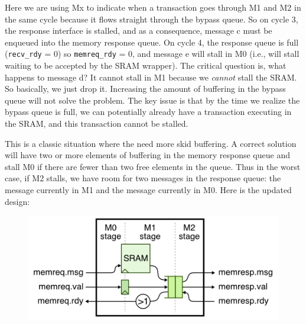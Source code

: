 \documentclass[a4paper,12pt,twoside]{article}
\begin{document}
Here we are using Mx to indicate when a transaction goes through M1 and M2 in the same cycle because it flows straight through the bypass queue. So on cycle 3, the response interface is stalled, and as a consequence, message c must be enqueued into the memory response queue. On cycle 4, the response queue is full (\texttt{recv\_rdy} = 0) so \texttt{memreq\_rdy} = 0, and message e will stall in M0 (i.e., will stall waiting to be accepted by the SRAM wrapper). The critical question is, what happens to message d? It cannot stall in M1 because we \textit{cannot} stall the SRAM. So basically, we just drop it. Increasing the amount of buffering in the bypass queue will not solve the problem. The key issue is that by the time we realize the bypass queue is full, we can potentially already have a transaction executing in the SRAM, and this transaction cannot be stalled.

This is a classic situation where the need more skid buffering. A correct solution will have two or more elements of buffering in the memory response queue and stall M0 if there are fewer than two free elements in the queue. Thus in the worst case, if M2 stalls, we have room for two messages in the response queue: the message currently in M1 and the message currently in M0. Here is the updated design:
\begin{figure}[H]
    \centering
    \includegraphics[width=\textwidth]{images/16.png}
\end{figure}
\end{document}
